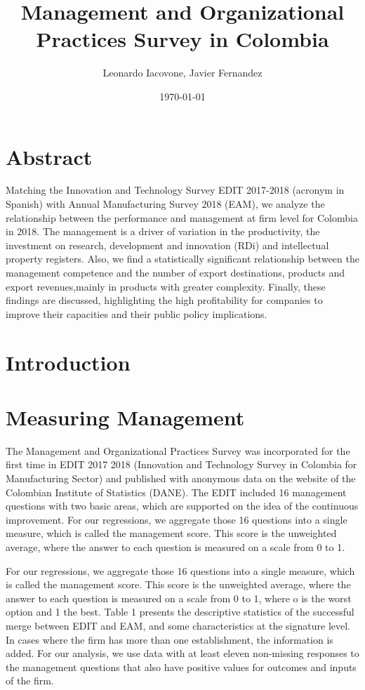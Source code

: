 \documentclass{article}
\title{Management and Organizational Practices Survey in Colombia}
\author{Leonardo Iacovone,
Javier Fernandez}
\date{\today}
\begin{document}
\maketitle

\section{Abstract}
\doublespacing
Matching the Innovation and Technology Survey EDIT 2017-2018 (acronym in Spanish) with Annual Manufacturing Survey 2018 (EAM), we analyze the relationship between the performance and management at firm level for Colombia in 2018. The management is a driver of variation in the productivity, the investment on research, development and innovation (RDi) and intellectual property registers. Also, we find a statistically significant relationship between the management competence and the number of export destinations, products and export revenues,mainly in products with greater complexity. Finally, these findings are discussed, highlighting the high profitability for companies to improve their capacities and their public policy implications.

\section{Introduction}

\section{Measuring Management}

The Management and Organizational Practices Survey was incorporated for the first time in EDIT 2017 2018 (Innovation and Technology Survey in Colombia for Manufacturing Sector) and published with anonymous data on the website of the Colombian Institute of Statistics (DANE). The EDIT included 16 management
questions with two basic areas, which are supported on the idea of the continuous improvement. For our regressions, we aggregate those 16 questions into a single measure, which is called the management score. This score is the unweighted average, where the answer to each question is measured on a scale from 0 to 1.

For our regressions, we aggregate those 16 questions into a single measure, which is called the management score. This score is the unweighted average, where the answer to each question is measured on a scale from 0 to 1, where o is the worst option and 1 the best. Table 1 presents the descriptive statistics of the successful merge between EDIT and EAM, and some characteristics at the signature level. In cases where the firm has
more than one establishment, the information is added. For our analysis, we use data with at least eleven non-missing responses to the management questions that also have positive values for outcomes and inputs
of the firm.
\end{document}
